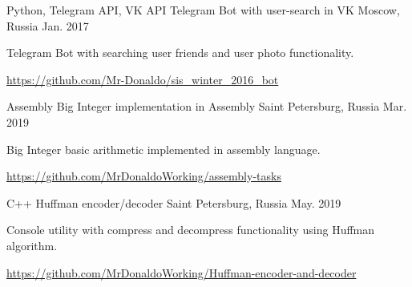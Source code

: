 

\begin{cventries}

  \cventry
    {Python, Telegram API, VK API} %
    {Telegram Bot with user-search in VK} %
    {Moscow, Russia} %
    {Jan. 2017} %
    {
      \begin{cvitems} %
        \item {Telegram Bot with searching user friends and user photo functionality.}
        \item {\url {https://github.com/Mr-Donaldo/sis_winter_2016_bot}}
      \end{cvitems}
    }

  \cventry
    {Assembly}%
    {Big Integer implementation in Assembly} %
    {Saint Petersburg, Russia} %
    {Mar. 2019} %
    {
      \begin{cvitems} %
        \item {Big Integer basic arithmetic implemented in assembly language.}
        \item {\url {https://github.com/MrDonaldoWorking/assembly-tasks}}
      \end{cvitems}
    }

  \cventry
    {C++}%
    {Huffman encoder/decoder} %
    {Saint Petersburg, Russia} %
    {May. 2019} %
    {
      \begin{cvitems} %
        \item {Console utility with compress and decompress functionality using Huffman algorithm.}
        \item {\url {https://github.com/MrDonaldoWorking/Huffman-encoder-and-decoder}}
      \end{cvitems}
    }


\end{cventries}
